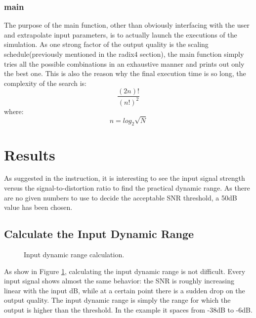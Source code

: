 \documentclass[a4paper]{article}
\begin{document}
\subsubsection{main}
The purpose of the main function, other than obviously interfacing with the user and extrapolate input parameters, is to actually launch the executions of the simulation.
As one strong factor of the output quality is the scaling schedule(previously mentioned in the radix4 section), the main function simply tries all the possible combinations in an exhaustive manner and prints out only the best one. This is also the reason why the final execution time is so long, the complexity of the search is: $$\frac{(2n)!}{(n!)^2}$$
where:
$$n = log_2{\sqrt{N}}$$
\pagebreak
\section{Results}
As suggested in the instruction, it is interesting to see the input signal strength versus the signal-to-distortion ratio to find the practical dynamic range.
As there are no given numbers to use to decide the acceptable SNR threshold, a 50dB value has been chosen.

\subsection{Calculate the Input Dynamic Range}
\begin{figure}
	\centering
	\resizebox{1.0\textwidth}{!}{}
	\caption{Input dynamic range calculation.}
	\label{Fig:DYN}
\end{figure}
As show in Figure \ref{Fig:DYN}, calculating the input dynamic range is not difficult. Every input signal shows almost the same behavior: the SNR is roughly increasing linear with the input dB, while at a certain point there is a sudden drop on the output quality. The input dynamic range is simply the range for which the output is higher than the threshold. In the example it spaces from -38dB to -6dB.
\end{document}

